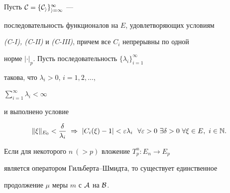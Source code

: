 




\begin{thm}\label{mx011}


Пусть $\cal{C}=\{C_i\}_{i=1}^{\infty}$ ---


последовательность функционалов на $E$, удовлетворяющих условиям


{\em (C-I), (C-II)} и {\em (C-III)}, причем все $C_i$ непрерывны по одной


норме $|\cdot|_p$. Пусть последовательность $\{\lambda_i\}_{i=1}^{\infty}$


такова, что $\lambda_i>0$, $i=1,2,\dotsc$,


$\sum\limits_{i=1}^{\infty}\lambda_i<\infty$


и выполнено условие


\begin{equation}\label{mx009}


\|\xi\|_{E_0}<\frac{\delta}{\lambda_i}\ \Rightarrow\


|C_i(\xi)-1 |<\varepsilon\lambda_i \ \


\forall \varepsilon>0\ \exists \delta>0\ \forall \xi\in E, \ i\in\Bbb{N}.


\end{equation}


Если для некоторого $n\ (>p)$ вложение $T^n_p:E_n\to E_p$


является оператором Гильберта--Шмидта, то существует единственное


продолжение $\mu$ меры $m$ с $\cal{A}$ на $\cal{B}$.


\end{thm}





